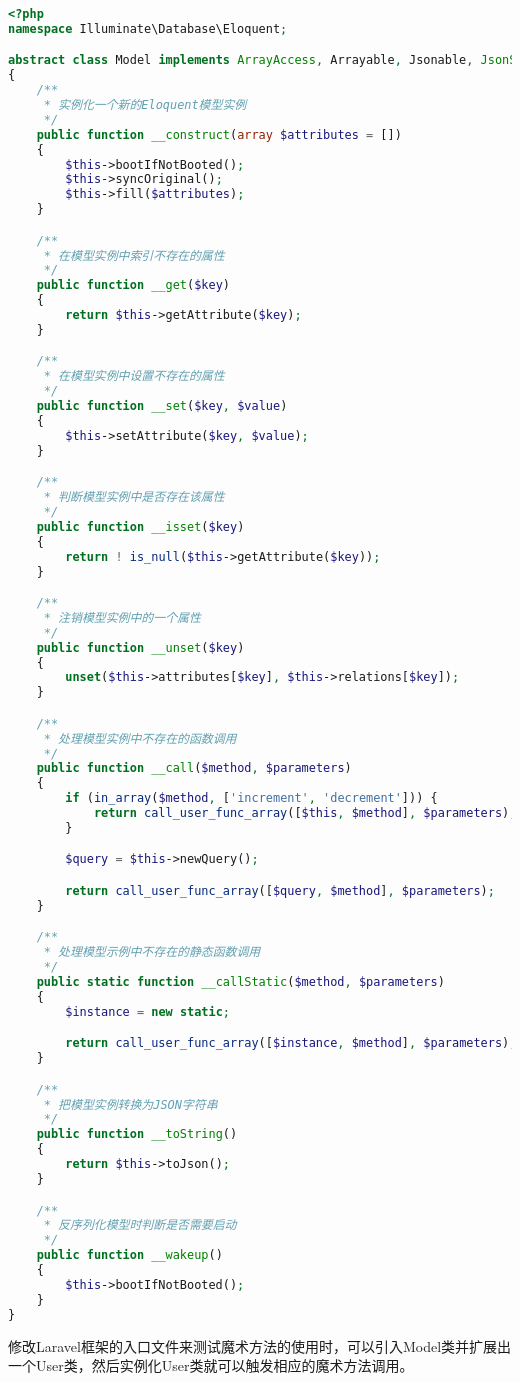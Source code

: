 \begin{lstlisting}[language=PHP]
<?php
namespace Illuminate\Database\Eloquent;

abstract class Model implements ArrayAccess, Arrayable, Jsonable, JsonSerializable, QueueableEntity, UrlRoutable
{
    /**
     * 实例化一个新的Eloquent模型实例
     */
    public function __construct(array $attributes = [])
    {
        $this->bootIfNotBooted();
        $this->syncOriginal();
        $this->fill($attributes);
    }

    /**
     * 在模型实例中索引不存在的属性
     */
    public function __get($key)
    {
        return $this->getAttribute($key);
    }

    /**
     * 在模型实例中设置不存在的属性
     */
    public function __set($key, $value)
    {
        $this->setAttribute($key, $value);
    }

    /**
     * 判断模型实例中是否存在该属性
     */
    public function __isset($key)
    {
        return ! is_null($this->getAttribute($key));
    }

    /**
     * 注销模型实例中的一个属性
     */
    public function __unset($key)
    {
        unset($this->attributes[$key], $this->relations[$key]);
    }

    /**
     * 处理模型实例中不存在的函数调用
     */
    public function __call($method, $parameters)
    {
        if (in_array($method, ['increment', 'decrement'])) {
            return call_user_func_array([$this, $method], $parameters);
        }

        $query = $this->newQuery();

        return call_user_func_array([$query, $method], $parameters);
    }

    /**
     * 处理模型示例中不存在的静态函数调用
     */
    public static function __callStatic($method, $parameters)
    {
        $instance = new static;

        return call_user_func_array([$instance, $method], $parameters);
    }

    /**
     * 把模型实例转换为JSON字符串
     */
    public function __toString()
    {
        return $this->toJson();
    }

    /**
     * 反序列化模型时判断是否需要启动
     */
    public function __wakeup()
    {
        $this->bootIfNotBooted();
    }
}
\end{lstlisting}

修改Laravel框架的入口文件来测试魔术方法的使用时，可以引入Model类并扩展出一个User类，然后实例化User类就可以触发相应的魔术方法调用。

